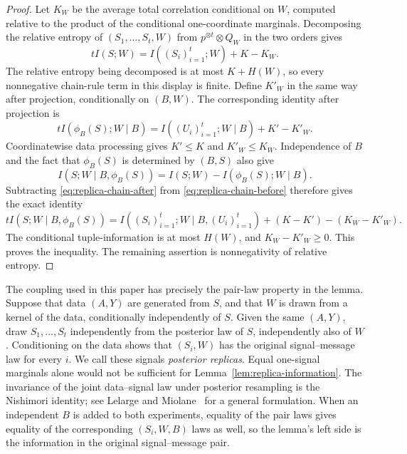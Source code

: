 \begin{proof}
Let $K_W$ be the average total correlation conditional on $W$, computed
relative to the product of the conditional one-coordinate marginals.
Decomposing the relative entropy of $(S_1,\ldots,S_t,W)$ from
$p^{\otimes t}\otimes Q_W$ in the two orders gives
\begin{equation}\label{eq:replica-chain-before}
 tI(S;W)=I((S_i)_{i=1}^t;W)+K-K_W.
\end{equation}
The relative entropy being decomposed is at most $K+H(W)$, so every
nonnegative chain-rule term in this display is finite. Define $K'_W$ in
the same way after projection, conditionally on $(B,W)$. The corresponding
identity after projection is
\begin{equation}\label{eq:replica-chain-after}
 tI(\phi_B(S);W\mid B)
 =I((U_i)_{i=1}^t;W\mid B)+K'-K'_W.
\end{equation}
Coordinatewise data processing gives $K'\le K$ and $K'_W\le K_W$.
Independence of $B$ and the fact that $\phi_B(S)$ is determined by $(B,S)$
also give
\[
 I(S;W\mid B,\phi_B(S))=I(S;W)-I(\phi_B(S);W\mid B).
\]
Subtracting \eqref{eq:replica-chain-after} from
\eqref{eq:replica-chain-before} therefore gives the exact identity
\[
 tI(S;W\mid B,\phi_B(S))
 =I((S_i)_{i=1}^t;W\mid B,(U_i)_{i=1}^t)
   +(K-K')-(K_W-K'_W).
\]
The conditional tuple-information is at most $H(W)$, and
$K_W-K'_W\ge0$. This proves the inequality.
The remaining assertion is nonnegativity of relative entropy.
\end{proof}

The coupling used in this paper has precisely the pair-law property in the
lemma. Suppose that data $(A,Y)$ are generated from $S$, and that $W$ is
drawn from a kernel of the data, conditionally independently of $S$.
Given the same $(A,Y)$, draw $S_1,\ldots,S_t$ independently from the
posterior law of $S$, independently also of $W$. Conditioning on the data
shows that $(S_i,W)$ has the original signal--message law for every $i$.
We call these signals \emph{posterior replicas}. Equal one-signal marginals
alone would not be sufficient for Lemma~\ref{lem:replica-information}.
The invariance of the joint data--signal law under posterior resampling
is the Nishimori identity; see Lelarge and
Miolane~\cite[Proposition 16]{LelargeMiolane2019} for a general formulation.
When an independent $B$ is added to both experiments, equality of the pair
laws gives equality of the corresponding $(S_i,W,B)$ laws as well, so the
lemma's left side is the information in the original signal--message pair.

